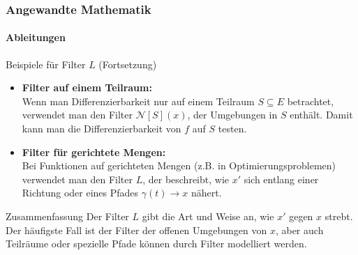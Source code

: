\documentclass{beamer}
\begin{document}
\begin{frame}
    \frametitle{Angewandte Mathematik}
    \framesubtitle{Ableitungen}

\begin{block}{Beispiele für Filter \( L \) (Fortsetzung)}
  \begin{itemize}
      
    \item \textbf{Filter auf einem Teilraum:} \\
    Wenn man Differenzierbarkeit nur auf einem Teilraum \( S \subseteq E \) betrachtet, 
    verwendet man den Filter \( \mathcal{N}[S](x) \), der Umgebungen in \( S \) enthält. Damit kann man die Differenzierbarkeit von \( f \) auf \( S \) testen.
  
    \item \textbf{Filter für gerichtete Mengen:} \\
    Bei Funktionen auf gerichteten Mengen (z.B. in Optimierungsproblemen) verwendet man den Filter \( L \), der beschreibt, wie \( x' \) sich entlang einer Richtung oder eines Pfades \( \gamma(t) \to x \) nähert.
  \end{itemize}
\end{block}

\vspace{-0.5cm} %

\begin{block}{Zusammenfassung}
  Der Filter \( L \) gibt die Art und Weise an, wie \( x' \) gegen \( x \) strebt. Der häufigste Fall ist der Filter der offenen Umgebungen von \( x \), aber auch Teilräume oder spezielle Pfade können durch Filter modelliert werden.
\end{block}

\end{frame}
\end{document}
